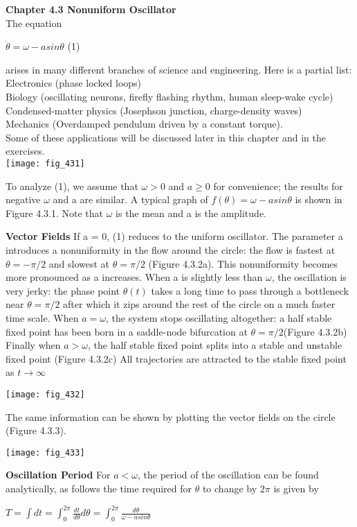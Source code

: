 \documentclass{article}
\newcommand\tab[1][1cm]{\hspace*{#1}}
\begin{document}
\textbf{Chapter 4.3 Nonuniform Oscillator} \\ \tab
The equation
\begin{center}
$\dot{\theta}=\omega-a sin \theta$ \tab (1)
\end{center}
arises in many different branches of science and engineering. Here is a partial list:
\\ \tab Electronics (phase locked loops)
\\ \tab Biology (oscillating neurons, firefly flashing rhythm, human sleep-wake cycle) 
\\ \tab Condensed-matter physics (Josephson junction, charge-density waves) 
\\ \tab Mechanics (Overdamped pendulum driven by a constant torque). \\
Some of these applications will be discussed later in this chapter and in the exercises.
\\
\texttt{[image: fig\_431]}

\tab To analyze (1), we assume that $\omega>0$ and $a \geq 0$ for convenience; the results for negative $\omega$ and a are similar. A typical graph of $f(\theta)=\omega-asin\theta$ is shown in Figure 4.3.1. Note that $\omega$ is the mean and a is the amplitude. 

\textbf{Vector Fields}
 If a = 0, (1) reduces to the uniform oscillator. The parameter a introduces a nonuniformity in the flow around the circle: the flow is fastest at $\theta = - \pi/2$ and slowest at $\theta = \pi/2$ (Figure 4.3.2a). This nonuniformity becomes more pronounced as a increases. When a is slightly less than $\omega$, the oscillation is very jerky: the phase point $\theta(t)$ takes a long time to pass through a bottleneck near $\theta = \pi/2$ after which it zips around the rest of the circle on a much faster time scale. When $a=\omega$, the system stops oscillating altogether: a half stable fixed point has been born in a saddle-node bifurcation at $\theta=\pi/2$(Figure 4.3.2b) Finally when $a>\omega$, the half stable fixed point splits into a stable and unstable fixed point (Figure 4.3.2c) All trajectories are attracted to the stable fixed point as $t \to \infty$

\texttt{[image: fig\_432]}

The same information can be shown by plotting the vector fields on the circle (Figure 4.3.3).

\texttt{[image: fig\_433]}

\textbf {Oscillation Period}
\tab For $a< \omega$, the period of the oscillation can be found analytically, as follows the time required for $\theta$ to change by $2\pi$ is given by 
\begin{center}
$T=\int dt=\int_{0}^{2\pi} \frac{dt}{d\theta} d\theta = \int_{0}^{2\pi} \frac{d\theta}{\omega-asin\theta}$
\end{center}
\end{document}
